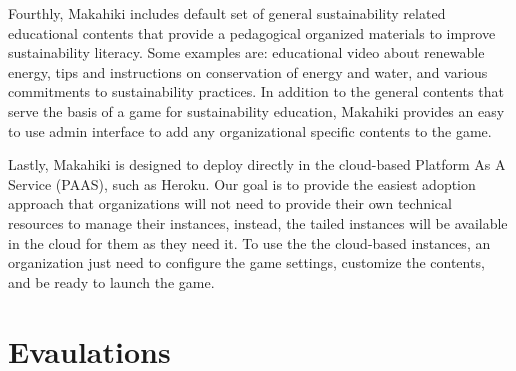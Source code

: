 \documentclass{acm_proc_article-sp}
\begin{document}
Fourthly, Makahiki includes default set of general sustainability related educational contents that provide a pedagogical organized materials to improve sustainability literacy. Some examples are: educational video about renewable energy, tips and instructions on conservation of energy and water, and various commitments to sustainability practices. In addition to the general contents that serve the basis of a game for sustainability education, Makahiki provides an easy to use admin interface to add any organizational specific contents to the game.

Lastly, Makahiki is designed to deploy directly in the cloud-based Platform As A Service (PAAS), such as Heroku. Our goal is to provide the easiest adoption approach that organizations will not need to provide their own technical resources to manage their instances, instead, the tailed instances will be available in the cloud for them as they need it. To use the the cloud-based instances, an organization just need to configure the game settings, customize the contents, and be ready to launch the game.

\section{Evaulations}
%
\end{document}
